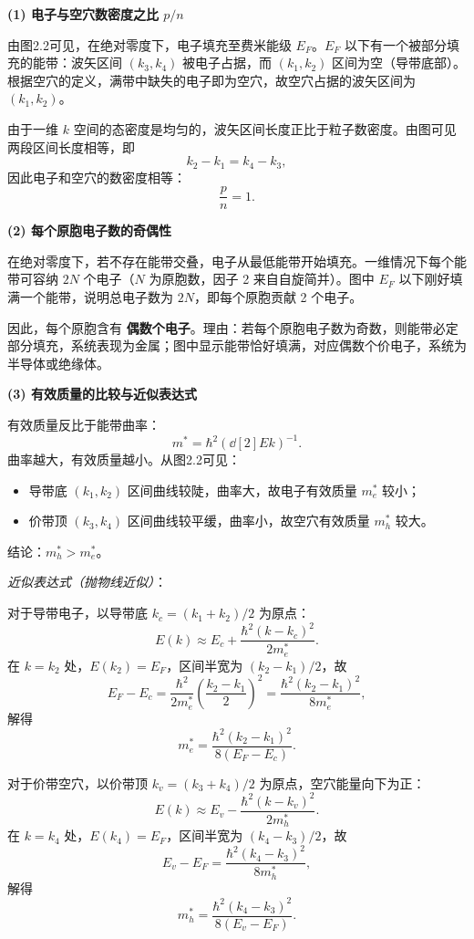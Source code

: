 \begin{derivationbox}[标准解题过程]
\textbf{(1) 电子与空穴数密度之比 $p/n$}

由图2.2可见，在绝对零度下，电子填充至费米能级 $E_F$。$E_F$ 以下有一个被部分填充的能带：波矢区间 $(k_3,k_4)$ 被电子占据，而 $(k_1,k_2)$ 区间为空（导带底部）。根据空穴的定义，满带中缺失的电子即为空穴，故空穴占据的波矢区间为 $(k_1,k_2)$。

由于一维 $k$ 空间的态密度是均匀的，波矢区间长度正比于粒子数密度。由图可见两段区间长度相等，即
\[
k_2-k_1=k_4-k_3,
\]
因此电子和空穴的数密度相等：
\begin{equation}
\boxed{\frac{p}{n}=1.}
\end{equation}

\textbf{(2) 每个原胞电子数的奇偶性}

在绝对零度下，若不存在能带交叠，电子从最低能带开始填充。一维情况下每个能带可容纳 $2N$ 个电子（$N$ 为原胞数，因子 2 来自自旋简并）。图中 $E_F$ 以下刚好填满一个能带，说明总电子数为 $2N$，即每个原胞贡献 2 个电子。

因此，每个原胞含有 \textbf{偶数个电子}。理由：若每个原胞电子数为奇数，则能带必定部分填充，系统表现为金属；图中显示能带恰好填满，对应偶数个价电子，系统为半导体或绝缘体。

\textbf{(3) 有效质量的比较与近似表达式}

有效质量反比于能带曲率：
\[
m^*=\hbar^2\left(\dd[2]{E}{k}\right)^{-1}.
\]
曲率越大，有效质量越小。从图2.2可见：
\begin{itemize}
    \item 导带底 $(k_1,k_2)$ 区间曲线较陡，曲率大，故电子有效质量 $m_e^*$ 较小；
    \item 价带顶 $(k_3,k_4)$ 区间曲线较平缓，曲率小，故空穴有效质量 $m_h^*$ 较大。
\end{itemize}
结论：$\boxed{m_h^*>m_e^*}$。

\textit{近似表达式（抛物线近似）}：

对于导带电子，以导带底 $k_c=(k_1+k_2)/2$ 为原点：
\[
E(k)\approx E_c+\frac{\hbar^2(k-k_c)^2}{2m_e^*}.
\]
在 $k=k_2$ 处，$E(k_2)=E_F$，区间半宽为 $(k_2-k_1)/2$，故
\[
E_F-E_c=\frac{\hbar^2}{2m_e^*}\left(\frac{k_2-k_1}{2}\right)^2=\frac{\hbar^2(k_2-k_1)^2}{8m_e^*},
\]
解得
\begin{equation}
\boxed{m_e^*=\frac{\hbar^2(k_2-k_1)^2}{8(E_F-E_c)}.}
\end{equation}

对于价带空穴，以价带顶 $k_v=(k_3+k_4)/2$ 为原点，空穴能量向下为正：
\[
E(k)\approx E_v-\frac{\hbar^2(k-k_v)^2}{2m_h^*}.
\]
在 $k=k_4$ 处，$E(k_4)=E_F$，区间半宽为 $(k_4-k_3)/2$，故
\[
E_v-E_F=\frac{\hbar^2(k_4-k_3)^2}{8m_h^*},
\]
解得
\begin{equation}
\boxed{m_h^*=\frac{\hbar^2(k_4-k_3)^2}{8(E_v-E_F)}.}
\end{equation}
\end{derivationbox}

